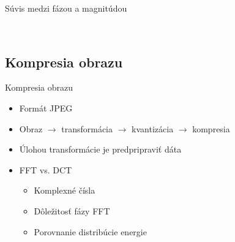 \documentclass{beamer}
\def\sipka{\rightarrow}
\begin{document}
\begin{frame}{Súvis medzi fázou a magnitúdou}
\begin{figure}
\begin{centering}
        \\
        \end{centering}
    \end{figure}
\end{frame}


\subsection{Kompresia obrazu}
\begin{frame}{Kompresia obrazu}
    \begin{itemize}
        \item Formát JPEG
        \item Obraz $\sipka$ transformácia $\sipka$ kvantizácia
          $\sipka$ kompresia
        \item Úlohou transformácie je predpripraviť dáta
        \item FFT vs. DCT
            \begin{itemize}
                \item Komplexné čísla
                \item Dôležitosť fázy FFT
                \item Porovnanie distribúcie energie
            \end{itemize}
    \end{itemize}
\end{frame}
\end{document}
